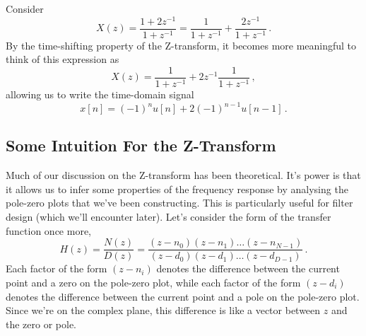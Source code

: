 %
\begin{exmp}
  Consider
  \begin{displaymath}
    X(z) = \frac{1 + 2z^{-1}}{1 + z^{-1}} = \frac{1}{1 + z^{-1}} + \frac{2z^{-1}}{1 + z^{-1}}\,.
  \end{displaymath}
  By the time-shifting property of the Z-transform, it becomes
  more meaningful to think of this expression as
  \begin{displaymath}
    X(z) = \frac{1}{1 + z^{-1}} + 2z^{-1}\frac{1}{1 + z^{-1}} \,,
  \end{displaymath}
  allowing us to write the time-domain signal
  \begin{displaymath}
    x[n] = (-1)^n u[n] + 2(-1)^{n-1}u[n-1] \,.
  \end{displaymath}
\end{exmp}

\subsection{Some Intuition For the Z-Transform}
%
Much of our discussion on the Z-transform has been theoretical.
It's power is that it allows us to infer some properties of the frequency
response by analysing the pole-zero plots that we've been constructing.
This is particularly useful for filter design (which we'll encounter later).
Let's consider the form of the transfer function once more,
%
\begin{displaymath}
  H(z) = \frac{N(z)}{D(z)}
  = \frac{(z-n_0)(z-n_1)\hdots(z-n_{N-1})}{(z-d_0)(z-d_1)\hdots(z-d_{D-1})} \,.
\end{displaymath}
%
Each factor of the form $(z-n_i)$ denotes the difference between the current
point and a zero on the pole-zero plot, while each factor of the form
$(z-d_i)$ denotes the difference between the current point and a pole on
the pole-zero plot. Since we're on the complex plane, this difference is
like a vector between $z$ and the zero or pole. 

